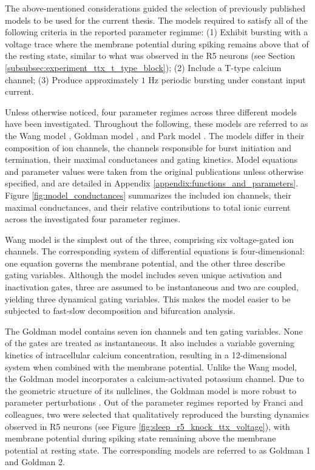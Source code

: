 \documentclass[../main.tex]{subfiles}
\begin{document}
The above-mentioned considerations guided the selection of previously published models to be used for the current thesis. The models required to satisfy all of the following criteria in the reported parameter regimme: (1) Exhibit bursting with a voltage trace where the membrane potential during spiking remains above that of the resting state, similar to what was observed in the R5 neurons (see Section \ref{subsubsec:experiment_ttx_t_type_block}); (2) Include a T-type calcium channel; (3) Produce approximately $1$ Hz periodic bursting under constant input current.

Unless otherwise noticed, four parameter regimes across three different models have been investigated. Throughout the following, these models are referred to as the Wang model \parencite{wangMultipleDynamicalModes1994}, Goldman model \parencite{franciRobustTunableBursting2018,goldmanGlobalStructureRobustness2001}, and Park model \parencite{parkMathematicalModelSubthalamic2021}. The models differ in their composition of ion channels, the
channels responsible for burst initiation and termination, their maximal conductances and gating kinetics. 
Model equations and parameter values were taken from the original publications unless otherwise specified, and are detailed in Appendix \ref{appendix:functions_and_parameters}.
Figure \ref{fig:model_conductances} summarizes the included ion channels, their maximal conductances, and their relative contributions to total ionic current across the investigated four parameter regimes.

Wang model is the simplest out of the three, comprising six voltage-gated ion channels.
The corresponding system of differential equations is four-dimensional: one equation governs the membrane potential, and the other three describe gating variables. Although the model includes seven unique activation and inactivation gates, three are assumed to be instantaneous and two are coupled, yielding three dynamical gating variables. This makes the model easier to be subjected to fast-slow decomposition and bifurcation analysis.

The Goldman model contains seven ion channels and ten gating variables. None of the gates are treated as instantaneous. It also includes a variable governing kinetics of intracellular calcium concentration, resulting in a 12-dimensional system when combined with the membrane potential.
Unlike the Wang model, the Goldman model incorporates a calcium-activated potassium channel. Due to the geometric structure of its nullclines, the Goldman model is more robust to parameter perturbations \parencite{franciRobustTunableBursting2018}.
Out of the parameter regimes reported by Franci and colleagues, two were selected that qualitatively reproduced the bursting dynamics observed in R5 neurons (see Figure \ref{fig:sleep_r5_knock_ttx_voltage}), with membrane potential during spiking state remaining above the membrane potential at resting state. The corresponding models are referred to as Goldman 1 and Goldman 2.
\end{document}

